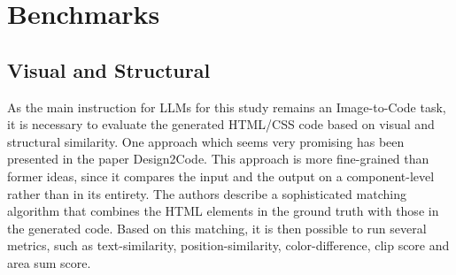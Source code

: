 \chapter{Benchmarks}\label{chapter:Benchmarks}

\section{Visual and Structural}
As the main instruction for LLMs for this study remains an Image-to-Code task, it 
is necessary to evaluate the generated HTML/CSS code based on visual and structural
similarity. One approach which seems very promising has been presented in the 
paper Design2Code. This approach is more fine-grained than former ideas, since 
it compares the input and the output on a component-level rather than in its entirety.
The authors describe a sophisticated matching algorithm that combines the 
HTML elements in the ground truth with those in the generated code. Based on this 
matching, it is then possible to run several metrics, such as text-similarity,
position-similarity, color-difference, clip score and area sum score.

